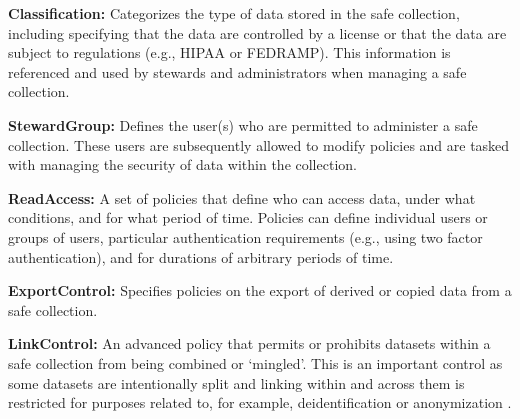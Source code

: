 \textbf{Classification:} Categorizes the type of data stored in the
safe collection, including specifying that the data are controlled by
a license or that the data are subject to regulations (e.g., HIPAA or FEDRAMP).
This information is referenced and used by stewards and administrators when
managing a safe collection.

\textbf{StewardGroup:} Defines the user(s) who are permitted to
administer a safe collection. These users are subsequently
allowed to modify policies and are tasked with managing the
security of data within the collection.

\textbf{ReadAccess:} A set of policies that define who can
access data, under what conditions, and for what period of time.
Policies can define individual users or groups of users, particular
authentication requirements (e.g., using two factor authentication),
and for durations of arbitrary periods of time.

\textbf{ExportControl:} Specifies policies on the export of derived or copied data
from a safe collection.

\textbf{LinkControl:} An advanced policy that permits
or prohibits datasets within a safe collection from being
combined or `mingled'. This is an important control as some datasets
are intentionally split and linking within and across them is restricted for purposes related to, for example, deidentification or anonymization .



